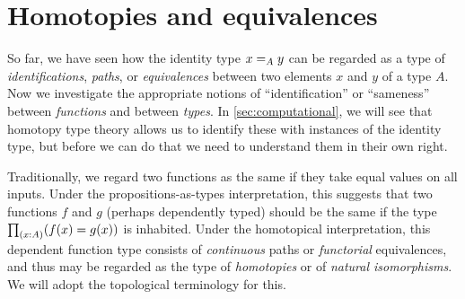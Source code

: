 



\section{Homotopies and equivalences}
\label{sec:basics-equivalences}

So far, we have seen how the identity type $\id[A]xy$ can be regarded as a type of \emph{identifications}, \emph{paths}, or \emph{equivalences} between two elements $x$ and $y$ of a type $A$.
Now we investigate the appropriate notions of ``identification'' or ``sameness'' between \emph{functions} and between \emph{types}.
In \autoref{sec:computational}, we will see that homotopy type theory allows us to identify these with instances of the identity type, but before we can do that we need to understand them in their own right.

Traditionally, we regard two functions as the same if they take equal values on all inputs.
Under the propositions-as-types interpretation, this suggests that two functions $f$ and $g$ (perhaps dependently typed) should be the same if the type $\prd{x:A} (f(x)=g(x))$ is inhabited.
Under the homotopical interpretation, this dependent function type consists of \emph{continuous} paths or \emph{functorial} equivalences, and thus may be regarded as the type of \emph{homotopies} or of \emph{natural isomorphisms}.
We will adopt the topological terminology for this.

